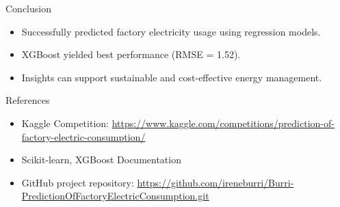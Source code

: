 \documentclass{beamer}
\begin{document}
\begin{frame}{Conclusion}
  \begin{itemize}
    \item Successfully predicted factory electricity usage using regression models.
    \item XGBoost yielded best performance (RMSE = 1.52).
    \item Insights can support sustainable and cost-effective energy management.
  \end{itemize}
\end{frame}

\begin{frame}{References}
  \begin{itemize}
    \item Kaggle Competition: \url{https://www.kaggle.com/competitions/prediction-of-factory-electric-consumption/}
    \item Scikit-learn, XGBoost Documentation
    \item GitHub project repository: \url{https://github.com/ireneburri/Burri-PredictionOfFactoryElectricConsumption.git}
  \end{itemize}
\end{frame}
\end{document}
